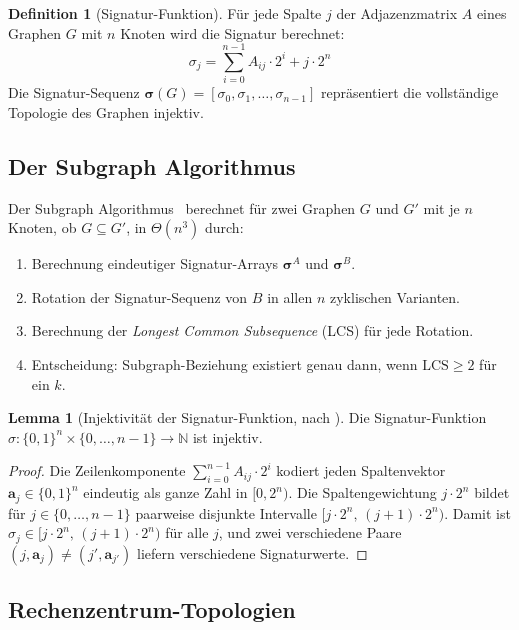 ﻿\documentclass[a4paper,12pt]{article}
\theoremstyle{definition}
\newtheorem{definition}{Definition}
\newtheorem{lemma}{Lemma}
\begin{document}
\begin{definition}[Signatur-Funktion]
  F\"{u}r jede Spalte $j$ der Adjazenzmatrix $A$ eines Graphen $G$ mit $n$ Knoten wird die Signatur berechnet:
  \[
    \sigma_j = \sum_{i=0}^{n-1} A_{ij} \cdot 2^i + j \cdot 2^n
  \]
  Die Signatur-Sequenz $\boldsymbol{\sigma}(G) = [\sigma_0, \sigma_1, \ldots, \sigma_{n-1}]$
  repr\"{a}sentiert die vollst\"{a}ndige Topologie des Graphen injektiv.
\end{definition}

\subsection{Der Subgraph Algorithmus}

Der Subgraph Algorithmus~\cite{epp2026subgraph} berechnet f\"{u}r zwei Graphen $G$ und $G'$ mit je $n$ Knoten, ob $G \subseteq G'$, in $\Theta(n^3)$ durch:
\begin{enumerate}
  \item Berechnung eindeutiger Signatur-Arrays $\boldsymbol{\sigma}^A$ und $\boldsymbol{\sigma}^B$.
  \item Rotation der Signatur-Sequenz von $B$ in allen $n$ zyklischen Varianten.
  \item Berechnung der \emph{Longest Common Subsequence} (LCS) f\"{u}r jede Rotation.
  \item Entscheidung: Subgraph-Beziehung existiert genau dann, wenn $\mathrm{LCS} \geq 2$ f\"{u}r ein $k$.
\end{enumerate}

\begin{lemma}[Injektivit\"{a}t der Signatur-Funktion, nach \cite{epp2026subgraph}]
  \label{lem:injektivitaet}
  Die Signatur-Funktion $\sigma: \{0,1\}^n \times \{0,\ldots,n-1\} \to \mathbb{N}$ ist injektiv.
\end{lemma}

\begin{proof}
  Die Zeilenkomponente $\sum_{i=0}^{n-1} A_{ij} \cdot 2^i$ kodiert jeden Spaltenvektor $\mathbf{a}_j \in \{0,1\}^n$ eindeutig als ganze Zahl in $[0, 2^n)$.
  Die Spaltengewichtung $j \cdot 2^n$ bildet f\"{u}r $j \in \{0,\ldots,n-1\}$ paarweise disjunkte Intervalle $[j \cdot 2^n,\, (j+1) \cdot 2^n)$.
  Damit ist $\sigma_j \in [j \cdot 2^n,\, (j+1) \cdot 2^n)$ f\"{u}r alle $j$, und zwei verschiedene Paare $(j, \mathbf{a}_j) \neq (j', \mathbf{a}_{j'})$ liefern verschiedene Signaturwerte.
\end{proof}

\subsection{Rechenzentrum-Topologien}
\end{document}
